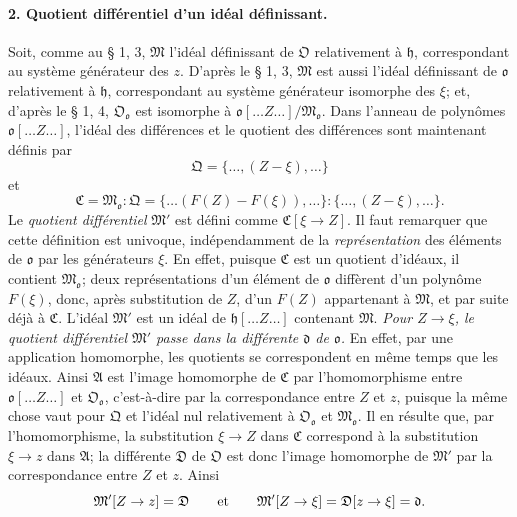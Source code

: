 \paragraph{2. Quotient différentiel d'un idéal définissant.}
Soit, comme au \S{} 1, 3, \(\mathfrak M\) l'idéal définissant de \(\mathfrak O\) relativement à \(\mathfrak h\), correspondant au système générateur des \(z\). D'après le \S{} 1, 3, \(\mathfrak M\) est aussi l'idéal définissant de \(\mathfrak o\) relativement à \(\mathfrak h\), correspondant au système générateur isomorphe des \(\xi\); et, d'après le \S{} 1, 4, \(\mathfrak O_{\mathfrak o}\) est isomorphe à \(\mathfrak o[\ldots Z\ldots]/\mathfrak M_{\mathfrak o}\). Dans l'anneau de polynômes \(\mathfrak o[\ldots Z\ldots]\), l'idéal des différences et le quotient des différences sont maintenant définis par
\[
\mathfrak Q=\{\ldots,(Z-\xi),\ldots\}
\]
et
\[
\mathfrak C=\mathfrak M_{\mathfrak o}:\mathfrak Q
=\{\ldots(F(Z)-F(\xi)),\ldots\}:\{\ldots,(Z-\xi),\ldots\}.
\]
Le \emph{quotient différentiel} \(\mathfrak M'\) est défini comme \(\mathfrak C[\xi\to Z]\). Il faut remarquer que cette définition est univoque, indépendamment de la \emph{représentation} des éléments de \(\mathfrak o\) par les générateurs \(\xi\). En effet, puisque \(\mathfrak C\) est un quotient d'idéaux, il contient \(\mathfrak M_{\mathfrak o}\); deux représentations d'un élément de \(\mathfrak o\) diffèrent d'un polynôme \(F(\xi)\), donc, après substitution de \(Z\), d'un \(F(Z)\) appartenant à \(\mathfrak M\), et par suite déjà à \(\mathfrak C\). L'idéal \(\mathfrak M'\) est un idéal de \(\mathfrak h[\ldots Z\ldots]\) contenant \(\mathfrak M\). \emph{Pour \(Z\to\xi\), le quotient différentiel \(\mathfrak M'\) passe dans la différente \(\mathfrak d\) de \(\mathfrak o\).} En effet, par une application homomorphe, les quotients se correspondent en même temps que les idéaux. Ainsi \(\mathfrak A\) est l'image homomorphe de \(\mathfrak C\) par l'homomorphisme entre \(\mathfrak o[\ldots Z\ldots]\) et \(\mathfrak O_{\mathfrak o}\), c'est-à-dire par la correspondance entre \(Z\) et \(z\), puisque la même chose vaut pour \(\mathfrak Q\) et l'idéal nul relativement à \(\mathfrak O_{\mathfrak o}\) et \(\mathfrak M_{\mathfrak o}\). Il en résulte que, par l'homomorphisme, la substitution \(\xi\to Z\) dans \(\mathfrak C\) correspond à la substitution \(\xi\to z\) dans \(\mathfrak A\); la différente \(\mathfrak D\) de \(\mathfrak O\) est donc l'image homomorphe de \(\mathfrak M'\) par la correspondance entre \(Z\) et \(z\). Ainsi
\[
\mathfrak M'[Z\to z]=\mathfrak D
\qquad\hbox{et}\qquad
\mathfrak M'[Z\to\xi]=\mathfrak D[z\to\xi]=\mathfrak d.
\]

